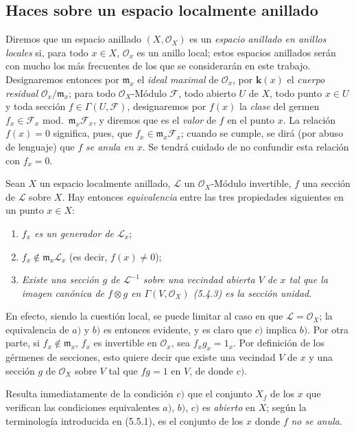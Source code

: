 \subsection{Haces sobre un espacio localmente anillado}
\label{subsection:0.5.5-fr}

\begin{env}[5.5.1]
\label{0.5.5.1-fr}
Diremos que un espacio anillado $(X,\mathcal{O}_X)$ es un \emph{espacio
anillado en anillos locales} si, para todo $x\in X$, $\mathcal{O}_x$ es un
anillo local; estos espacios anillados serán con mucho los más frecuentes de los
que se considerarán en este trabajo. Designaremos entonces por
$\mathfrak{m}_x$ el \emph{ideal maximal} de $\mathcal{O}_x$, por $\boldsymbol{k}(x)$ el
\emph{cuerpo residual} $\mathcal{O}_x/\mathfrak{m}_x$; para todo
$\mathcal{O}_X$-Módulo $\mathcal{F}$, todo abierto $U$ de $X$, todo punto
$x\in U$ y toda sección $f\in\Gamma(U,\mathcal{F})$, designaremos por
$f(x)$ la \emph{clase} del germen
$f_x\in\mathcal{F}_x$ mod.~$\mathfrak{m}_x\mathcal{F}_x$, y diremos que
es el \emph{valor} de $f$ en el punto $x$. La relación $f(x)=0$ significa,
pues, que $f_x\in\mathfrak{m}_x\mathcal{F}_x$; cuando se cumple, se dirá
(por abuso de lenguaje) que $f$ \emph{se anula en $x$}. Se tendrá cuidado de no
confundir esta relación con $f_x=0$.
\end{env}

\begin{env}[5.5.2]
\label{0.5.5.2-fr}
Sean $X$ un espacio localmente anillado, $\mathcal{L}$ un
$\mathcal{O}_X$-Módulo invertible, $f$ una sección de $\mathcal{L}$ sobre
$X$. Hay entonces \emph{equivalencia} entre las tres propiedades siguientes
en un punto $x\in X$:
\begin{enumerate}
  \item[a)] \emph{$f_x$ es un generador de $\mathcal{L}_x$};
  \item[b)] \emph{$f_x\notin\mathfrak{m}_x\mathcal{L}_x$} (es decir,
    $f(x)\neq0$);
  \item[c)] \emph{Existe una sección $g$ de $\mathcal{L}^{-1}$ sobre
    una vecindad abierta $V$ de $x$ tal que la imagen canónica de $f\otimes
    g$ en $\Gamma(V,\mathcal{O}_X)$ \textup{(5.4.3)} es la sección unidad}.
\end{enumerate}

En efecto, siendo la cuestión local, se puede limitar al caso en que
$\mathcal{L}=\mathcal{O}_X$; la equivalencia de $a)$ y $b)$ es entonces
evidente, y es claro que $c)$ implica $b)$. Por otra parte, si
$f_x\notin\mathfrak{m}_x$, $f_x$ es invertible en $\mathcal{O}_x$, sea
$f_xg_x=1_x$. Por definición de los gérmenes de secciones, esto quiere decir que
existe una vecindad $V$ de $x$ y una sección $g$ de $\mathcal{O}_X$ sobre
$V$ tal que $fg=1$ en $V$, de donde $c)$.

Resulta inmediatamente de la condición $c)$ que el conjunto $X_f$ de los $x$
que verifican las condiciones equivalentes $a)$, $b)$, $c)$ es \emph{abierto} en
$X$; según la terminología introducida en (5.5.1), es el conjunto de los
$x$ donde $f$ \emph{no se anula}.
\end{env}

